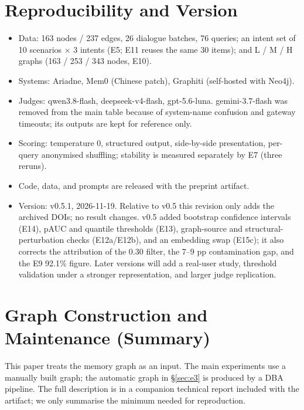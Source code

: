 \documentclass[11pt]{article}
\begin{document}
\section{Reproducibility and Version}
\label{app:repro}

\begin{itemize}
  \item Data: 163 nodes / 237 edges, 26 dialogue batches, 76 queries; an intent set of 10
        scenarios $\times$ 3 intents (E5; E11 reuses the same 30 items); and L / M / H graphs
        (163 / 253 / 343 nodes, E10).
  \item Systems: Ariadne, Mem0 (Chinese patch), Graphiti (self-hosted with Neo4j).
  \item Judges: qwen3.8-flash, deepseek-v4-flash, gpt-5.6-luna. gemini-3.7-flash was removed
        from the main table because of system-name confusion and gateway timeouts; its outputs
        are kept for reference only.
  \item Scoring: temperature 0, structured output, side-by-side presentation, per-query
        anonymised shuffling; stability is measured separately by E7 (three reruns).
  \item Code, data, and prompts are released with the preprint artifact.
  \item Version: v0.5.1, 2026-11-19. Relative to v0.5 this revision only adds the archived
        DOIs; no result changes. v0.5 added bootstrap confidence intervals (E14),
        pAUC and quantile thresholds (E13), graph-source and structural-perturbation checks
        (E12a/E12b), and an embedding swap (E15c); it also corrects the attribution of the
        0.30 filter, the 7--9 pp contamination gap, and the E9 92.1\% figure.
        Later versions will add a real-user study, threshold validation under a stronger
        representation, and larger judge replication.
\end{itemize}

\section{Graph Construction and Maintenance (Summary)}
\label{app:dba}

This paper treats the memory graph as an input. The main experiments use a manually built graph;
the automatic graph in \S\ref{sec:e3} is produced by a DBA pipeline. The full description is in a
companion technical report included with the artifact; we only summarise the
minimum needed for reproduction.
\end{document}
